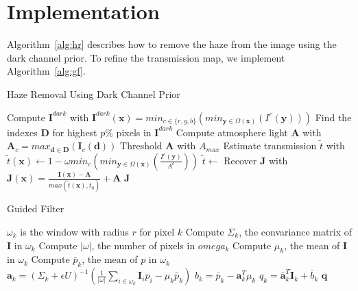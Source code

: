 \documentclass{article}
\begin{document}
\section{Implementation}

Algorithm~\ref{alg:hr} describes how to remove the haze from the image using the dark channel prior. To refine the transmission map, we implement Algorithm~\ref{alg:gf}.

\begin{algorithm}[H]
\centering
\caption{Haze Removal Using Dark Channel Prior}
\label{alg:hr}
  \begin{algorithmic}[1]
        \State Compute $\mathbf{I}^{dark}$ with $\mathbf{I}^{dark}(\mathbf{x}) = min_{c \in \{r,g,b\}}( min_{\mathbf{y} \in \Omega(\mathbf{x})}(I^c(\mathbf{y})))$
        \State Find the indexes $\mathbf{D}$ for highest $p\%$  pixels in $\mathbf{I}^{dark}$
        \State Compute atmosphere light $\mathbf{A}$ with $\mathbf{A}_c = max_{\mathbf{d} \in  \mathbf{D}}(\mathbf{I}_c(\mathbf{d}))$
        \State Threshold $\mathbf{A}$ with $A_{max}$
        \State Estimate transmission $\tilde{t}$ with $\tilde{t}(\mathbf{x}) \gets 1 - \omega min_{c}( min_{\mathbf{y} \in \Omega(\mathbf{x})}(\frac{I^c(\mathbf{y})}{A^c}))$
        \State $\tilde{t} \gets$ 
        \State Recover $\mathbf{J}$ with $\mathbf{J}(\mathbf{x}) = \frac{\mathbf{I}(\mathbf{x}) - \mathbf{A}}{max(\tilde{t}(\mathbf{x}),t_0)} + \mathbf{A}$
      \State \Return $\mathbf{J}$
    \EndFunction
  \end{algorithmic}
\end{algorithm}

\begin{algorithm}[H]
\centering
\caption{Guided Filter}
\label{alg:gf}
  \begin{algorithmic}[1]
	        \State $\omega_k$ is the window with radius $r$ for pixel $k$
	        \State Compute $\Sigma_k$, the convariance matrix of $\mathbf{I}$ in $\omega_k$
	        \State Compute $|\omega|$, the number of pixels in $omega_k$
	        \State Compute $\mu_k$, the mean of $\mathbf{I}$ in $\omega_k$ 
	        \State Compute $\bar{p}_k$, the mean of $p$ in $\omega_k$
	        \State $\mathbf{a}_k = (\Sigma_k + \epsilon U)^{-1}(\frac{1}{|\omega|}\sum_{i \in \omega_k}\mathbf{I}_i p_i - \mu_k \bar{p}_k)$
	        \State $b_k = \bar{p}_k - \mathbf{a}_k^T\mu_k$
	        \State $q_k = \bar{\mathbf{a}}_k^T\mathbf{I}_k + \bar{b}_k$
        \EndFor
      \Return $\mathbf{q}$
    \EndFunction
  \end{algorithmic}
\end{algorithm}
\end{document}
